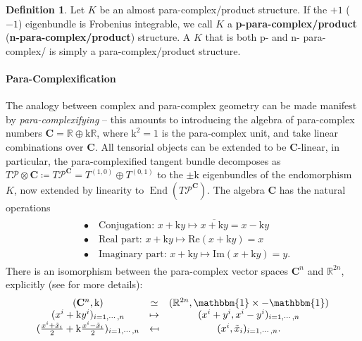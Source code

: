 \documentclass{article}
\newcommand{\Cc}{\mathbf{C}}
\newcommand{\RR}{\mathbb{R}}
\newcommand{\id}{\mathbbm{1}}
\newcommand{\PS}{\mathcal{P}}
\newcommand{\xt}{{\tilde{x}}}
\newcommand{\kk}{\mathrm{k}}
\theoremstyle{definition}
\newtheorem{Def}[theorem]{Definition}
\theoremstyle{definition}
\theoremstyle{remark}
\DeclareMathOperator{\End}{End}
\begin{document}
\begin{Def}
Let $K$ be an almost para-complex/product structure. If the $+1$ ($-1$) eigenbundle is Frobenius integrable, we call $K$ a {\bf p-para-complex/product} ({\bf n-para-complex/product}) structure. A $K$ that is both p- and n- para-complex/ is simply a para-complex/product structure.
\end{Def}

\paragraph{Para-Complexification}
The analogy between complex and para-complex geometry can be made manifest by {\it para-complexifying} -- this amounts to introducing the algebra of para-complex numbers $\Cc=\RR\oplus \kk\RR$, where $\kk^2=1$ is the para-complex unit, and take linear combinations over $\Cc$. All tensorial objects can be extended to be $\Cc$-linear, in particular, the para-complexified tangent bundle decomposes as $T\PS\otimes \Cc\coloneqq T\PS^\Cc=T^{(1,0)}\oplus T^{(0,1)}$ to the $\pm \kk$ eigenbundles of the endomorphism $K$, now extended by linearity to $\End(T\PS^\Cc)$. The algebra $\Cc$ has the natural operations
\begin{align}
\begin{aligned}
&\bullet\quad \text{Conjugation: }x+\kk y\mapsto \overline{x+\kk y}=x-\kk y\\
&\bullet\quad \text{Real part: } x+\kk y \mapsto \text{Re}(x+\kk y)=x\\
&\bullet\quad \text{Imaginary part: } x+\kk y \mapsto \text{Im}(x+\kk y)=y.
\end{aligned}
\end{align}
There is an isomorphism between the para-complex vector spaces $\Cc^n$ and $\RR^{2n}$, explicitly (see \cite[Ch.~15]{Cortes:2010ykx} for more details):
\begin{align}\label{tab:identification}
\begin{array}{ccc}
(\Cc^n,\kk)&\simeq &(\RR^{2n},\id\times -\id)\\
(x^i+\kk y^i)_{i=1,\cdots,n} &\mapsto & (x^i+y^i,x^i-y^i)_{i=1,\cdots,n}\\
(\frac{x^i+\xt_i}{2}+\kk\frac{x^i-\xt_i}{2})_{i=1,\cdots,n} &\mapsfrom & (x^i,\xt_i)_{i=1,\cdots,n}.
\end{array}
\end{align}
\end{document}
